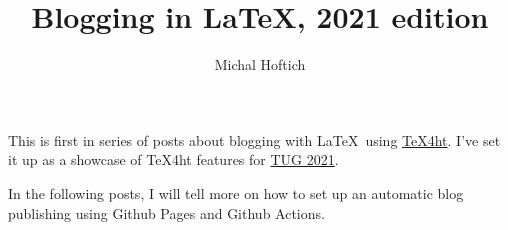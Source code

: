 \documentclass{article}
\title{Blogging in LaTeX, 2021 edition}
\author{Michal Hoftich}
\begin{document}
\maketitle


This is first in series of posts about blogging with \LaTeX\ using
\href{https://tug.org/tex4ht/}{\TeX4ht}. I've set it up as a showcase of
\TeX4ht features for \href{https://tug.org/tug2021/}{TUG 2021}.

In the following posts, I will tell more on how to set up an automatic
blog publishing using Github Pages and Github Actions.


\end{document}
